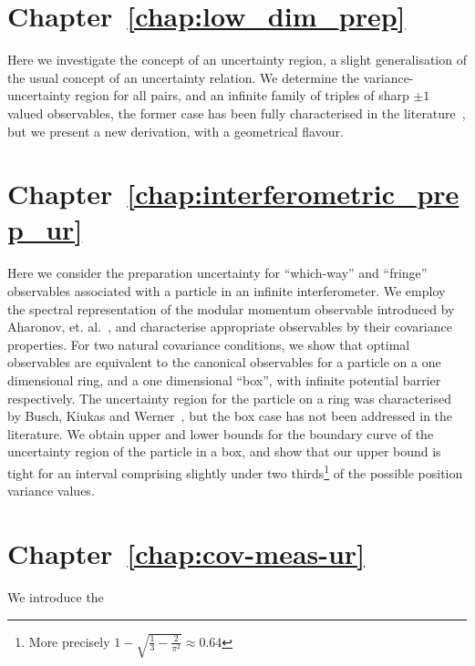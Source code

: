 \section*{Chapter~\ref{chap:low_dim_prep}}

Here we investigate the concept of an uncertainty region, a slight generalisation of the usual concept of an uncertainty relation. We determine the variance-uncertainty region for all pairs, and an infinite family of triples of sharp $\pm 1$ valued observables, the former case has been fully characterised in the literature~\cites{LiQiao2015}{AbbottAlzieuHallBranciard2016}, but we present a new derivation, with a geometrical flavour.

\section*{Chapter~\ref{chap:interferometric_prep_ur}}

Here we consider the preparation uncertainty for ``which-way'' and ``fringe'' observables associated with a particle in an infinite interferometer. We employ the spectral representation of the modular momentum observable introduced by Aharonov, et. al.~\cite{aharonov-modular-variables}, and characterise appropriate observables by their covariance properties. For two natural covariance conditions, we show that optimal observables are equivalent to the canonical observables for a particle on a one dimensional ring, and a one dimensional ``box'', with infinite potential barrier respectively. The uncertainty region for the particle on a ring was characterised by Busch, Kiukas and Werner~\cite{sharp-ur-num-angle}, but the box case has not been addressed in the literature. We obtain upper and lower bounds for the boundary curve of the uncertainty region of the particle in a box, and show that our upper bound is tight for an interval comprising slightly under two thirds\footnote{More precisely $1 - \sqrt{\frac{1}{3} - \frac{2}{\pi^2}} \approx 0.64$} of the possible position variance values.

\section*{Chapter~\ref{chap:cov-meas-ur}}

We introduce the 

